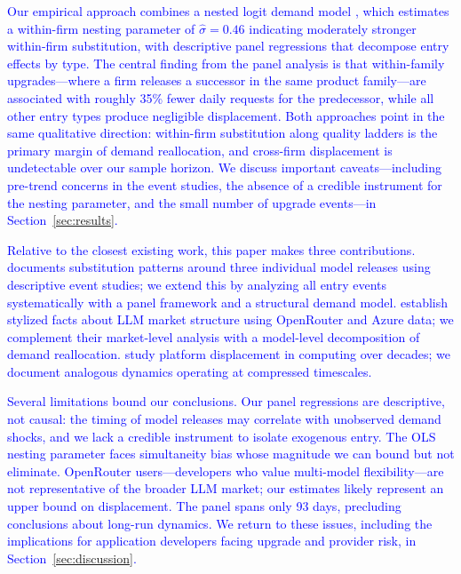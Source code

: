 \documentclass[11pt, a4paper]{article}
\begin{document}
\textcolor{blue}{Our empirical approach combines a nested logit demand model \citep{berry1994estimating, mcfadden1978modelling}, which estimates a within-firm nesting parameter of $\hat{\sigma} = 0.46$ indicating moderately stronger within-firm substitution, with descriptive panel regressions that decompose entry effects by type. The central finding from the panel analysis is that within-family upgrades---where a firm releases a successor in the same product family---are associated with roughly 35\% fewer daily requests for the predecessor, while all other entry types produce negligible displacement. Both approaches point in the same qualitative direction: within-firm substitution along quality ladders is the primary margin of demand reallocation, and cross-firm displacement is undetectable over our sample horizon. We discuss important caveats---including pre-trend concerns in the event studies, the absence of a credible instrument for the nesting parameter, and the small number of upgrade events---in Section~\ref{sec:results}.}

\textcolor{blue}{Relative to the closest existing work, this paper makes three contributions. \citet{fradkin2025demand} documents substitution patterns around three individual model releases using descriptive event studies; we extend this by analyzing all entry events systematically with a panel framework and a structural demand model. \citet{demirer2025emerging} establish stylized facts about LLM market structure using OpenRouter and Azure data; we complement their market-level analysis with a model-level decomposition of demand reallocation. \citet{bresnahan1999technological} study platform displacement in computing over decades; we document analogous dynamics operating at compressed timescales.}

\textcolor{blue}{Several limitations bound our conclusions. Our panel regressions are descriptive, not causal: the timing of model releases may correlate with unobserved demand shocks, and we lack a credible instrument to isolate exogenous entry. The OLS nesting parameter faces simultaneity bias whose magnitude we can bound but not eliminate. OpenRouter users---developers who value multi-model flexibility---are not representative of the broader LLM market; our estimates likely represent an upper bound on displacement. The panel spans only 93 days, precluding conclusions about long-run dynamics. We return to these issues, including the implications for application developers facing upgrade and provider risk, in Section~\ref{sec:discussion}.}
\end{document}

